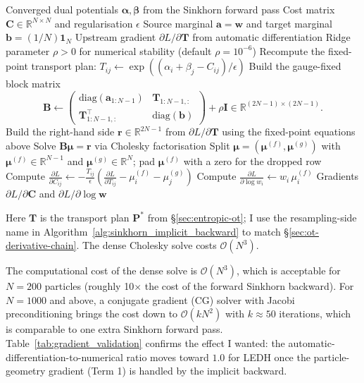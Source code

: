 \documentclass{article}
\begin{document}
\begin{algorithm}[H]
\caption{Implicit differentiation backward pass for the Sinkhorn transport plan}
\label{alg:sinkhorn_implicit_backward}
\begin{algorithmic}[1]
\REQUIRE Converged dual potentials $\boldsymbol{\alpha}, \boldsymbol{\beta}$ from the Sinkhorn forward pass
\REQUIRE Cost matrix $\mathbf{C} \in \mathbb{R}^{N \times N}$ and regularisation $\epsilon$
\REQUIRE Source marginal $\mathbf{a} = \mathbf{w}$ and target marginal $\mathbf{b} = (1/N)\mathbf{1}_N$
\REQUIRE Upstream gradient $\partial L / \partial \mathbf{T}$ from automatic differentiation
\REQUIRE Ridge parameter $\rho > 0$ for numerical stability (default $\rho = 10^{-6}$)
\STATE Recompute the fixed-point transport plan: $T_{ij} \leftarrow \exp\!\left((\alpha_i+\beta_j-C_{ij})/\epsilon\right)$
\STATE Build the gauge-fixed block matrix
\[
\mathbf{B} \leftarrow
\begin{pmatrix}
\mathrm{diag}(\mathbf{a}_{1:N-1}) & \mathbf{T}_{1:N-1,:} \\
\mathbf{T}_{1:N-1,:}^{\top} & \mathrm{diag}(\mathbf{b})
\end{pmatrix}
+ \rho\mathbf{I}
\in \mathbb{R}^{(2N-1)\times(2N-1)}.
\]
\STATE Build the right-hand side $\mathbf{r}\in\mathbb{R}^{2N-1}$ from $\partial L/\partial\mathbf{T}$ using the fixed-point equations above
\STATE Solve $\mathbf{B}\boldsymbol{\mu}=\mathbf{r}$ via Cholesky factorisation
\STATE Split $\boldsymbol{\mu}=(\boldsymbol{\mu}^{(f)},\boldsymbol{\mu}^{(g)})$ with $\boldsymbol{\mu}^{(f)}\in\mathbb{R}^{N-1}$ and $\boldsymbol{\mu}^{(g)}\in\mathbb{R}^{N}$; pad $\boldsymbol{\mu}^{(f)}$ with a zero for the dropped row
\STATE Compute $\displaystyle \frac{\partial L}{\partial C_{ij}} \leftarrow -\frac{T_{ij}}{\epsilon}\left(\frac{\partial L}{\partial T_{ij}}-\mu_i^{(f)}-\mu_j^{(g)}\right)$
\STATE Compute $\displaystyle \frac{\partial L}{\partial \log w_i} \leftarrow w_i\,\mu_i^{(f)}$
\RETURN Gradients $\partial L / \partial \mathbf{C}$ and $\partial L / \partial \log\mathbf{w}$
\end{algorithmic}
\end{algorithm}

Here $\mathbf{T}$ is the transport plan $\mathbf{P}^{*}$ from \S\ref{sec:entropic-ot}; I use the resampling-side name in Algorithm~\ref{alg:sinkhorn_implicit_backward} to match \S\ref{sec:ot-derivative-chain}. The dense Cholesky solve costs $\mathcal{O}(N^3)$.

The computational cost of the dense solve is $\mathcal{O}(N^3)$, which is acceptable for $N = 200$ particles (roughly 10$\times$ the cost of the forward Sinkhorn backward). For $N = 1000$ and above, a conjugate gradient (CG) solver with Jacobi preconditioning brings the cost down to $\mathcal{O}(kN^2)$ with $k \approx 50$ iterations, which is comparable to one extra Sinkhorn forward pass. Table~\ref{tab:gradient_validation} confirms the effect I wanted: the automatic-differentiation-to-numerical ratio moves toward $1.0$ for LEDH once the particle-geometry gradient (Term 1) is handled by the implicit backward.
\end{document}
